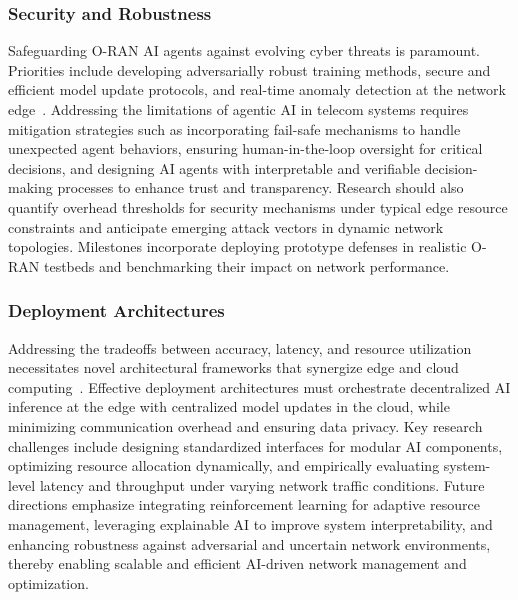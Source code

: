\documentclass[sigconf]{acmart}
\begin{document}
\subsubsection{Security and Robustness}
Safeguarding O-RAN AI agents against evolving cyber threats is paramount. Priorities include developing adversarially robust training methods, secure and efficient model update protocols, and real-time anomaly detection at the network edge~\cite{ref50}. Addressing the limitations of agentic AI in telecom systems requires mitigation strategies such as incorporating fail-safe mechanisms to handle unexpected agent behaviors, ensuring human-in-the-loop oversight for critical decisions, and designing AI agents with interpretable and verifiable decision-making processes to enhance trust and transparency. Research should also quantify overhead thresholds for security mechanisms under typical edge resource constraints and anticipate emerging attack vectors in dynamic network topologies. Milestones incorporate deploying prototype defenses in realistic O-RAN testbeds and benchmarking their impact on network performance.

\subsubsection{Deployment Architectures}
Addressing the tradeoffs between accuracy, latency, and resource utilization necessitates novel architectural frameworks that synergize edge and cloud computing~\cite{ref50}. Effective deployment architectures must orchestrate decentralized AI inference at the edge with centralized model updates in the cloud, while minimizing communication overhead and ensuring data privacy. Key research challenges include designing standardized interfaces for modular AI components, optimizing resource allocation dynamically, and empirically evaluating system-level latency and throughput under varying network traffic conditions. Future directions emphasize integrating reinforcement learning for adaptive resource management, leveraging explainable AI to improve system interpretability, and enhancing robustness against adversarial and uncertain network environments, thereby enabling scalable and efficient AI-driven network management and optimization.
\end{document}
